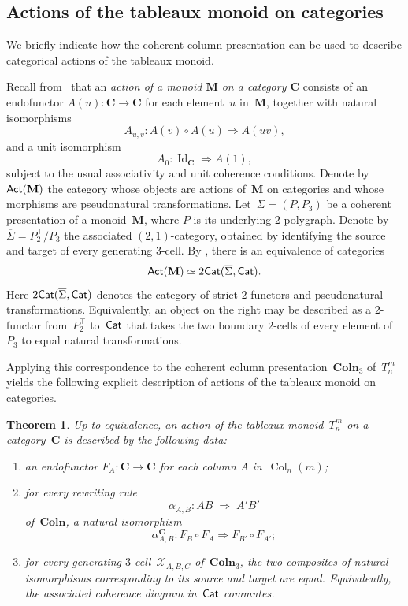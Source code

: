 \documentclass[a4paper, twoside, 11pt, english]{article}
\theoremstyle{plain}
\newtheorem{theorem}[subsubsection]{Theorem}
\theoremstyle{definition}
\newcommand{\dfl}{\Rightarrow}
\newcommand{\tck}[1]{#1^{\top}}
\DeclareMathOperator{\col}{Col}
\newcommand{\M}{\mathbf{M}}
\def\catego#1{{\bf{\sf #1}}}
\newcommand{\Cat}{\catego{Cat}}
\newcommand{\Act}{\catego{Act}}
\newcommand{\Colo}{\mathbf{Coln}}
\def\Xr{\mathcal{X}}
\begin{document}
\subsection{Actions of the tableaux monoid on categories}
\label{SS:Actions}

We briefly indicate how the coherent column presentation can be used to
describe categorical actions of the tableaux monoid.

Recall from~\cite{GaussentGuiraudMalbos15} that an \emph{action of a monoid $\M$ on a category $\mathbf{C}$} consists of an endofunctor $A(u):\mathbf{C}\to\mathbf{C}$ for each element~$u$ in~$\M$, together with natural isomorphisms 
\[ 
A_{u,v}:A(v)\circ A(u)\Rightarrow A(uv), 
\] 
and a unit isomorphism
\[
A_0:\operatorname{Id}_{\mathbf C}\Rightarrow A(1),
\]
subject to the usual associativity and unit coherence conditions. Denote by~$\Act(\M)$ the category whose objects are actions
of~$\M$ on categories and whose morphisms are pseudonatural
transformations.
Let~$\Sigma=(P,P_3)$ be a coherent presentation of a monoid~$\M$, where
$P$ is its underlying $2$-polygraph. Denote by~$\overline{\Sigma}=\tck{P}_2/P_3$
the associated $(2,1)$-category, obtained by identifying the source and
target of every generating $3$-cell. By
\cite[Theorem~5.1.6]{GaussentGuiraudMalbos15}, there is an equivalence
of categories
\[
\Act(\M)\simeq 2\Cat(\overline{\Sigma},\Cat).
\]
Here $2\Cat(\overline{\Sigma},\Cat)$ denotes the category of strict $2$-functors and pseudonatural transformations.
Equivalently, an object on the right may be described as a $2$-functor
from~$\tck{P}_2$ to~$\Cat$ that takes the two boundary $2$-cells of every
element of~$P_3$ to equal natural transformations.

Applying this correspondence to the coherent column presentation~$\Colo_3$ of~$T_n^m$ yields the following explicit description of actions of the tableaux monoid on categories.

\begin{theorem}
\label{thm:actions}
Up to equivalence, an action of the tableaux monoid~$T_n^m$
on a category~$\mathbf C$ is described by the following data:
\begin{enumerate}[\bf i)]
\item an endofunctor $F_A:\mathbf C\to\mathbf C$ for each column
$A$ in~$\col_n(m)$;
\item for every rewriting rule
\[
\alpha_{A,B}:AB \;\dfl\; A'B'
\]
of~$\Colo$, a natural isomorphism
\[
\alpha_{A,B}^\mathbf{C}:
F_B\circ F_A
\Rightarrow
F_{B'}\circ F_{A'};
\]
\item for every generating $3$-cell~$\Xr_{A,B,C}$ of~$\Colo_3$, the
two composites of natural isomorphisms corresponding to its source and
target are equal. Equivalently, the associated coherence diagram in~$\Cat$ commutes.
\end{enumerate}
\end{theorem}
\end{document}
